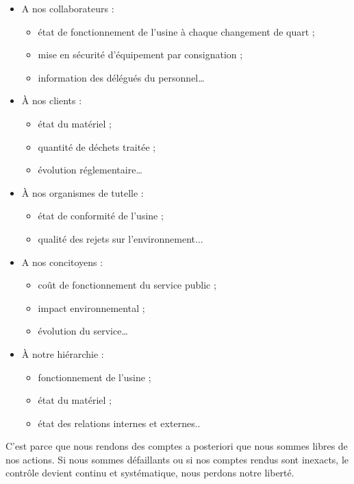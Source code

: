 \begin{itemize}

\item A nos collaborateurs : 
    \begin{itemize}
   \item état de fonctionnement de l’usine à chaque changement de quart ;
    \item mise en sécurité d’équipement par  consignation ;
    \item information des délégués du personnel…
    \end{itemize}

\item À nos clients :
    \begin{itemize}
    \item état du matériel ;
    \item quantité de déchets traitée ;
    \item évolution réglementaire…
    \end{itemize}
\item À nos organismes de tutelle :
    \begin{itemize}
    \item état de conformité de l’usine ;
    \item qualité des rejets sur l’environnement...
    \end{itemize}
\item A nos concitoyens :
\begin{itemize}
    \item coût de fonctionnement du service public ;
    \item impact environnemental ;
    \item évolution du service…
\end{itemize}
\item À notre hiérarchie :
    \begin{itemize}
    \item fonctionnement de l’usine ;
    \item état du matériel ;
    \item état des relations internes et externes..
    \end{itemize}
\end{itemize}


C’est parce que nous rendons des comptes a posteriori que nous sommes libres de nos actions. Si nous sommes défaillants ou si nos comptes rendus sont inexacts, le contrôle devient continu et systématique, nous perdons notre liberté.
\vspace{0.3cm}


